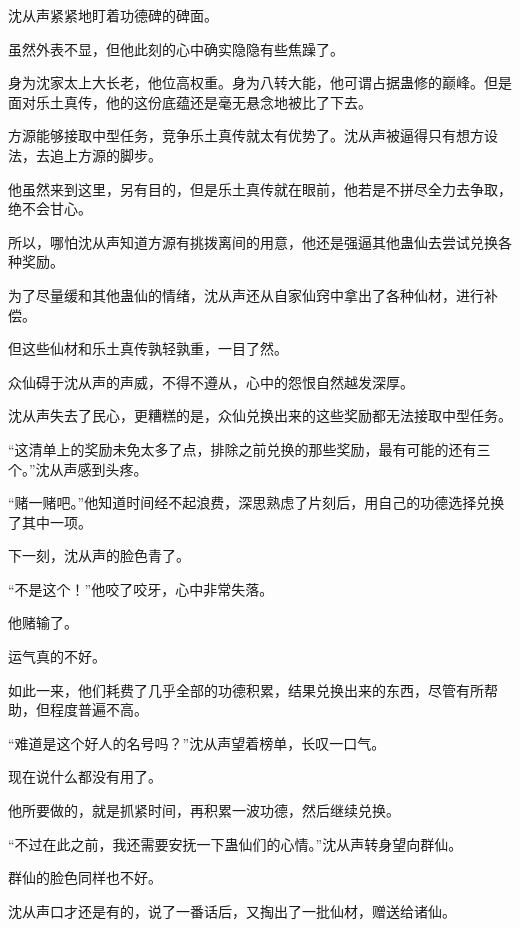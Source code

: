 
\begin{this_body}



沈从声紧紧地盯着功德碑的碑面。

虽然外表不显，但他此刻的心中确实隐隐有些焦躁了。

身为沈家太上大长老，他位高权重。身为八转大能，他可谓占据蛊修的巅峰。但是面对乐土真传，他的这份底蕴还是毫无悬念地被比了下去。

方源能够接取中型任务，竞争乐土真传就太有优势了。沈从声被逼得只有想方设法，去追上方源的脚步。

他虽然来到这里，另有目的，但是乐土真传就在眼前，他若是不拼尽全力去争取，绝不会甘心。

所以，哪怕沈从声知道方源有挑拨离间的用意，他还是强逼其他蛊仙去尝试兑换各种奖励。

为了尽量缓和其他蛊仙的情绪，沈从声还从自家仙窍中拿出了各种仙材，进行补偿。

但这些仙材和乐土真传孰轻孰重，一目了然。

众仙碍于沈从声的声威，不得不遵从，心中的怨恨自然越发深厚。

沈从声失去了民心，更糟糕的是，众仙兑换出来的这些奖励都无法接取中型任务。

“这清单上的奖励未免太多了点，排除之前兑换的那些奖励，最有可能的还有三个。”沈从声感到头疼。

“赌一赌吧。”他知道时间经不起浪费，深思熟虑了片刻后，用自己的功德选择兑换了其中一项。

下一刻，沈从声的脸色青了。

“不是这个！”他咬了咬牙，心中非常失落。

他赌输了。

运气真的不好。

如此一来，他们耗费了几乎全部的功德积累，结果兑换出来的东西，尽管有所帮助，但程度普遍不高。

“难道是这个好人的名号吗？”沈从声望着榜单，长叹一口气。

现在说什么都没有用了。

他所要做的，就是抓紧时间，再积累一波功德，然后继续兑换。

“不过在此之前，我还需要安抚一下蛊仙们的心情。”沈从声转身望向群仙。

群仙的脸色同样也不好。

沈从声口才还是有的，说了一番话后，又掏出了一批仙材，赠送给诸仙。


\end{this_body}
